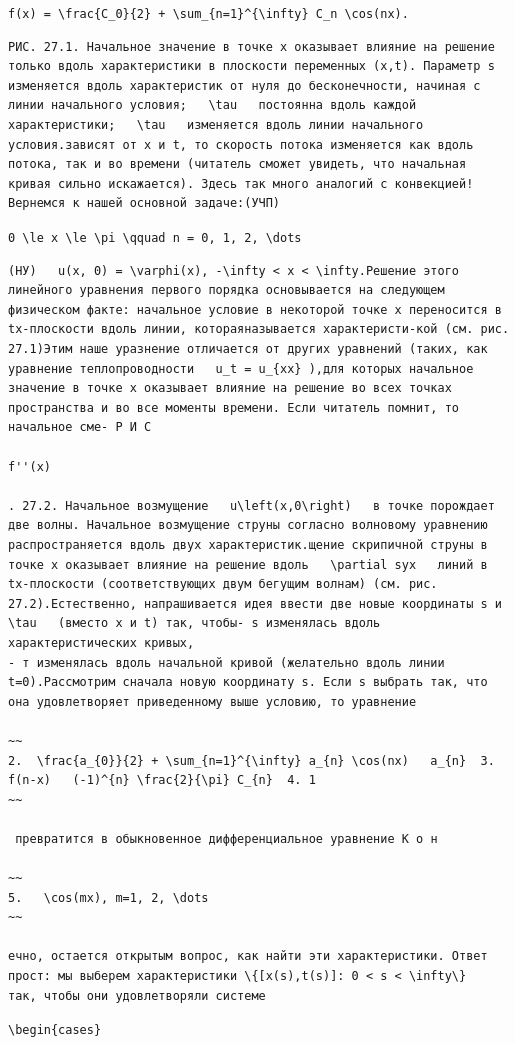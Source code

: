 \documentclass[
  ukrainian,
]{article}
\begin{document}
\texttt{f(x)\ =\ \textbackslash{}frac\{C\_0\}\{2\}\ +\ \textbackslash{}sum\_\{n=1\}\^{}\{\textbackslash{}infty\}\ C\_n\ \textbackslash{}cos(nx).}

\begin{verbatim}
РИС. 27.1. Начальное значение в точке x оказывает влияние на решение только вдоль характеристики в плоскости переменных (x,t). Параметр s изменяется вдоль характеристик от нуля до бесконечности, начиная с линии начального условия;   \tau   постоянна вдоль каждой характеристики;   \tau   изменяется вдоль линии начального условия.зависят от x и t, то скорость потока изменяется как вдоль потока, так и во времени (читатель сможет увидеть, что начальная кривая сильно искажается). Здесь так много аналогий с конвекцией!Вернемся к нашей основной задаче:(УЧП)
\end{verbatim}

\texttt{0\ \textbackslash{}le\ x\ \textbackslash{}le\ \textbackslash{}pi\ \textbackslash{}qquad\ n\ =\ 0,\ 1,\ 2,\ \textbackslash{}dots}

\begin{verbatim}
(НУ)   u(x, 0) = \varphi(x), -\infty < x < \infty.Решение этого линейного уравнения первого порядка основывается на следующем физическом факте: начальное условие в некоторой точке x переносится в tx-плоскости вдоль линии, котораяназывается характеристи-кой (см. рис. 27.1)Этим наше уразнение отличается от других уравнений (таких, как уравнение теплопроводности   u_t = u_{xx} ),для которых начальное значение в точке x оказывает влияние на решение во всех точках пространства и во все моменты времени. Если читатель помнит, то начальное сме- Р И С 

f''(x)

. 27.2. Начальное возмущение   u\left(x,0\right)   в точке порождает две волны. Начальное возмущение струны согласно волновому уравнению распространяется вдоль двух характеристик.щение скрипичной струны в точке x оказывает влияние на решение вдоль   \partial syx   линий в tx-плоскости (соответствующих двум бегущим волнам) (см. рис. 27.2).Естественно, напрашивается идея ввести две новые координаты s и   \tau   (вместо x и t) так, чтобы- s изменялась вдоль характеристических кривых,
- т изменялась вдоль начальной кривой (желательно вдоль линии t=0).Рассмотрим сначала новую координату s. Если s выбрать так, что она удовлетворяет приведенному выше условию, то уравнение 

~~
2.  \frac{a_{0}}{2} + \sum_{n=1}^{\infty} a_{n} \cos(nx)   a_{n}  3.  f(n-x)   (-1)^{n} \frac{2}{\pi} C_{n}  4. 1
~~

 превратится в обыкновенное дифференциальное уравнение К о н 

~~
5.   \cos(mx), m=1, 2, \dots
~~

ечно, остается открытым вопрос, как найти эти характеристики. Ответ прост: мы выберем характеристики \{[x(s),t(s)]: 0 < s < \infty\}   так, чтобы они удовлетворяли системе
\end{verbatim}

\texttt{\textbackslash{}begin\{cases\}}
\end{document}
